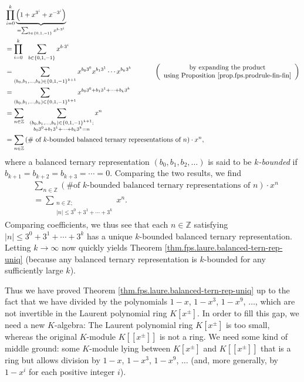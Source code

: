 \begin{align*}
&  \prod_{i=0}^{k}\underbrace{\left(  1+x^{3^{i}}+x^{-3^{i}}\right)  }%
_{=\sum_{b\in\left\{  0,1,-1\right\}  }x^{b\cdot3^{i}}}\\
&  =\prod_{i=0}^{k}\ \ \sum_{b\in\left\{  0,1,-1\right\}  }x^{b\cdot3^{i}}\\
&  =\sum_{\left(  b_{0},b_{1},\ldots,b_{k}\right)  \in\left\{  0,1,-1\right\}
^{k+1}}x^{b_{0}3^{0}}x^{b_{1}3^{1}}\cdots x^{b_{k}3^{k}}%
\ \ \ \ \ \ \ \ \ \ \left(
\begin{array}
[c]{c}%
\text{by expanding the product}\\
\text{using Proposition \ref{prop.fps.prodrule-fin-fin}}%
\end{array}
\right) \\
&  =\sum_{\left(  b_{0},b_{1},\ldots,b_{k}\right)  \in\left\{  0,1,-1\right\}
^{k+1}}x^{b_{0}3^{0}+b_{1}3^{1}+\cdots+b_{k}3^{k}}\\
&  =\sum_{n\in\mathbb{Z}}\ \ \sum_{\substack{\left(  b_{0},b_{1},\ldots
,b_{k}\right)  \in\left\{  0,1,-1\right\}  ^{k+1};\\b_{0}3^{0}+b_{1}%
3^{1}+\cdots+b_{k}3^{k}=n}}x^{n}\\
&  =\sum_{n\in\mathbb{Z}}\left(  \text{\# of }k\text{-bounded balanced ternary
representations of }n\right)  \cdot x^{n},
\end{align*}
where a balanced ternary representation $\left(  b_{0},b_{1},b_{2}%
,\ldots\right)  $ is said to be $k$\emph{-bounded} if $b_{k+1}=b_{k+2}%
=b_{k+3}=\cdots=0$. Comparing the two results, we find%
\begin{align*}
&  \sum_{n\in\mathbb{Z}}\left(  \text{\# of }k\text{-bounded balanced ternary
representations of }n\right)  \cdot x^{n}\\
&  =\sum_{\substack{n\in\mathbb{Z};\\\left\vert n\right\vert \leq3^{0}%
+3^{1}+\cdots+3^{k}}}x^{n}.
\end{align*}
Comparing coefficients, we thus see that each $n\in\mathbb{Z}$ satisfying
$\left\vert n\right\vert \leq3^{0}+3^{1}+\cdots+3^{k}$ has a unique
$k$-bounded balanced ternary representation. Letting $k\rightarrow\infty$ now
quickly yields Theorem \ref{thm.fps.laure.balanced-tern-rep-uniq} (because any
balanced ternary representation is $k$-bounded for any sufficiently large $k$).

Thus we have proved Theorem \ref{thm.fps.laure.balanced-tern-rep-uniq} up to
the fact that we have divided by the polynomials $1-x$, $1-x^{3}$, $1-x^{9}$,
$\ldots$, which are not invertible in the Laurent polynomial ring $K\left[
x^{\pm}\right]  $. In order to fill this gap, we need a new $K$-algebra: The
Laurent polynomial ring $K\left[  x^{\pm}\right]  $ is too small, whereas the
original $K$-module $K\left[  \left[  x^{\pm}\right]  \right]  $ is not a
ring. We need some kind of middle ground: some $K$-module lying between
$K\left[  x^{\pm}\right]  $ and $K\left[  \left[  x^{\pm}\right]  \right]  $
that is a ring but allows division by $1-x$, $1-x^{3}$, $1-x^{9}$, $\ldots$
(and, more generally, by $1-x^{i}$ for each positive integer $i$).

